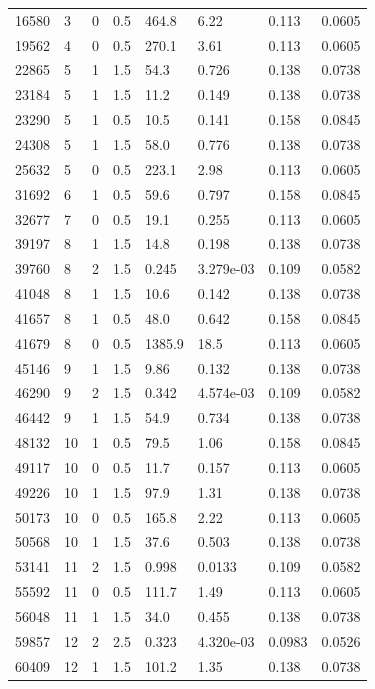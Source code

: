 \documentclass[preview]{standalone}
\begin{document}
{{\begin{tabular}{L{1.2cm}C{1.2cm} C{0.3cm}C{0.5cm} C{1.4cm}C{1.4cm} C{1.4cm}C{1.4cm}}
  16580  &     3  & 0     & 0.5 &  464.8  & 6.22  & 0.113 &  0.0605   \\ 
  19562  &     4  & 0     & 0.5 &  270.1  & 3.61  & 0.113 &  0.0605   \\ 
  22865  &     5  & 1     & 1.5 &  54.3  & 0.726  & 0.138 &  0.0738   \\ 
  23184  &     5  & 1     & 1.5 &  11.2  & 0.149  & 0.138 &  0.0738   \\ 
  23290  &     5  & 1     & 0.5 &  10.5  & 0.141  & 0.158 &  0.0845   \\ 
  24308  &     5  & 1     & 1.5 &  58.0  & 0.776  & 0.138 &  0.0738   \\ 
  25632  &     5  & 0     & 0.5 &  223.1  & 2.98  & 0.113 &  0.0605   \\ 
  31692  &     6  & 1     & 0.5 &  59.6  & 0.797  & 0.158 &  0.0845   \\ 
  32677  &     7  & 0     & 0.5 &  19.1  & 0.255  & 0.113 &  0.0605   \\ 
  39197  &     8  & 1     & 1.5 &  14.8  & 0.198  & 0.138 &  0.0738   \\ 
  39760  &     8  & 2     & 1.5 &  0.245  & 3.279e-03  & 0.109 &  0.0582   \\ 
  41048  &     8  & 1     & 1.5 &  10.6  & 0.142  & 0.138 &  0.0738   \\ 
  41657  &     8  & 1     & 0.5 &  48.0  & 0.642  & 0.158 &  0.0845   \\ 
  41679  &     8  & 0     & 0.5 &  1385.9  & 18.5  & 0.113 &  0.0605   \\ 
  45146  &     9  & 1     & 1.5 &  9.86  & 0.132  & 0.138 &  0.0738   \\ 
  46290  &     9  & 2     & 1.5 &  0.342  & 4.574e-03  & 0.109 &  0.0582   \\ 
  46442  &     9  & 1     & 1.5 &  54.9  & 0.734  & 0.138 &  0.0738   \\ 
  48132  &    10  & 1     & 0.5 &  79.5  & 1.06  & 0.158 &  0.0845   \\ 
  49117  &    10  & 0     & 0.5 &  11.7  & 0.157  & 0.113 &  0.0605   \\ 
  49226  &    10  & 1     & 1.5 &  97.9  & 1.31  & 0.138 &  0.0738   \\ 
  50173  &    10  & 0     & 0.5 &  165.8  & 2.22  & 0.113 &  0.0605   \\ 
  50568  &    10  & 1     & 1.5 &  37.6  & 0.503  & 0.138 &  0.0738   \\ 
  53141  &    11  & 2     & 1.5 &  0.998  & 0.0133  & 0.109 &  0.0582   \\ 
  55592  &    11  & 0     & 0.5 &  111.7  & 1.49  & 0.113 &  0.0605   \\ 
  56048  &    11  & 1     & 1.5 &  34.0  & 0.455  & 0.138 &  0.0738   \\ 
  59857  &    12  & 2     & 2.5 &  0.323  & 4.320e-03  & 0.0983 &  0.0526   \\ 
  60409  &    12  & 1     & 1.5 &  101.2  & 1.35  & 0.138 &  0.0738   \\ 
\hline 
\end{tabular} 

}}
\end{document}
